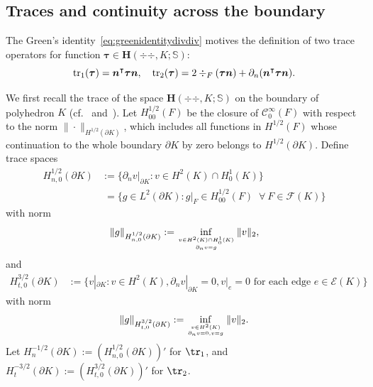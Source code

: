 \subsection{Traces and continuity across the boundary}\label{subsec:trace}
The Green's identity~\eqref{eq:greenidentitydivdiv} motives the definition of two trace operators for function $\boldsymbol \tau\in \boldsymbol{H}(\div{\div },K; \mathbb{S})$:
$$
{\rm tr}_1(\boldsymbol \tau) = \boldsymbol n^{\intercal}\boldsymbol \tau\boldsymbol  n, \quad
{\rm tr}_2(\boldsymbol \tau) = 2\div_F(\boldsymbol \tau\boldsymbol n)+\partial_n (\boldsymbol  n^{\intercal}\boldsymbol \tau\boldsymbol  n). 
$$


We first recall the trace of the space $\boldsymbol{H}(\div{\div },K; \mathbb{S})$ on the boundary of polyhedron $K$  (cf.~\cite[Lemma 3.2]{Fuhrer;Heuer;Niemi:2019ultraweak} and~\cite{Sinwel2009,PechsteinSchoeberl2018}).
Let $H_{00}^{1/2}(F)$ be the closure of $\mathcal C_0^{\infty}(F)$ with respect to the norm $\|\cdot\|_{H^{1/2}(\partial K)}$, which includes all functions in $H^{1/2}(F)$ whose continuation to the whole boundary $\partial K$ by zero belongs to $H^{1/2}(\partial K)$.
Define trace spaces
\begin{align*}
H_{n,0}^{1/2}(\partial K)&:=\{\partial_n v|_{\partial K}: v\in H^2(K)\cap H_0^1(K)\} \\
&\;=\{g\in L^2(\partial K): g|_F\in H_{00}^{1/2}(F)\;\;\forall~F\in\mathcal F(K)\}
\end{align*}
with norm
\[
\|g\|_{H_{n,0}^{1/2}(\partial K)}:=\inf_{v\in H^2(K)\cap H_0^1(K)\atop \partial_n v=g}\|v\|_2,
\]
and
\begin{align*}
H_{t,0}^{3/2}(\partial K)&:=\{v|_{\partial K}: v\in H^2(K), \partial_nv|_{\partial K}=0, v|_{e}=0 \textrm{ for each edge } e\in\mathcal E(K) \}
\end{align*}
with norm
\[
\|g\|_{H_{t,0}^{3/2}(\partial K)}:=\inf_{v\in H^2(K)\atop \partial_n v=0, v=g}\|v\|_2.
\]
Let $H_n^{-1/2}(\partial K):=(H_{n,0}^{1/2}(\partial K))'$ for $\tr_1$, and $H_t^{-3/2}(\partial K):=(H_{t,0}^{3/2}(\partial K))'$ for $\tr_2$. 


